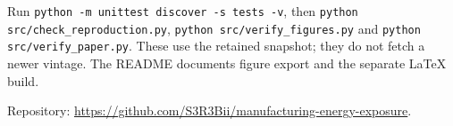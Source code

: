 \documentclass[11pt,letterpaper]{article}
\begin{document}
Run \texttt{python -m unittest discover -s tests -v}, then \texttt{python src/check\_reproduction.py}, \texttt{python src/verify\_figures.py} and \texttt{python src/verify\_paper.py}. These use the retained snapshot; they do not fetch a newer vintage. The README documents figure export and the separate LaTeX build.

Repository: \url{https://github.com/S3R3Bii/manufacturing-energy-exposure}.
\end{document}
